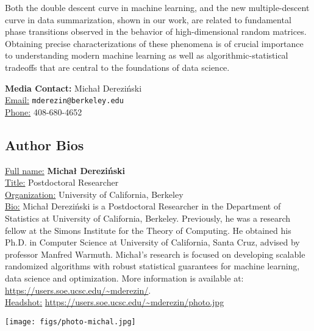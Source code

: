 \documentclass[11pt, oneside]{article}   	%
\begin{document}
Both the double descent curve in machine learning, and the new
multiple-descent curve in data summarization, shown in our work, are
related to fundamental phase transitions observed in the behavior of
high-dimensional random matrices. Obtaining precise characterizations
of these phenomena is of crucial importance to understanding modern
machine learning as well as algorithmic-statistical tradeoffs that are
central to the foundations of data science.
\vspace{2mm}

\noindent
\textbf{Media Contact:}
Micha{\l} Derezi\'nski\\
\underline{Email:} \texttt{mderezin@berkeley.edu}\\
\underline{Phone:} 408-680-4652
\subsection*{Author Bios} 
\begin{minipage}{.7\textwidth}
  \underline{Full name:} \textbf{Micha{\l} Derezi\'nski}\\
\underline{Title:} Postdoctoral Researcher\\
\underline{Organization:} University of California, Berkeley\\
\underline{Bio:} Michał Dereziński is a Postdoctoral Researcher in the
Department of Statistics at University of California,
Berkeley. Previously, he was a research fellow at the Simons Institute
for the Theory of Computing. He obtained his Ph.D. in Computer Science
at University of California, Santa Cruz, advised by professor Manfred
Warmuth. Michał's research is focused on developing scalable
randomized algorithms with robust statistical guarantees for machine
learning, data science and optimization. More information is available
at: \url{https://users.soe.ucsc.edu/~mderezin/}.\\
\underline{Headshot:} \url{https://users.soe.ucsc.edu/~mderezin/photo.jpg}
\end{minipage}\hfill
\begin{minipage}{.25\textwidth}
  \texttt{[image: figs/photo-michal.jpg]}
\end{minipage}
\vspace{5mm}
\end{document}
